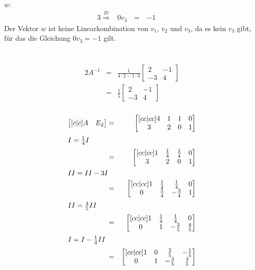 \documentclass[10pt,a4paper,oneside,ngerman,numbers=noenddot]{scrartcl}
\begin{document}
$w$:\\
\begin{alignat*}{3}
\overset{IV}{\Rightarrow} & 0v_{3} &\,=\,& -1 &&
\end{alignat*}
Der Vektor $w$ ist keine Linearkombination von $v_{1}$, $v_{2}$ und $v_{3}$, da es kein $v_{3}$ gibt, für das die Gleichung $0v_{3} = -1$ gilt.

\section{} %
\subsection{} %
\subsubsection{} %
\begin{alignat*}{2}
A^{-1} &=& \frac{1}{4 \cdot 2 - 1 \cdot 3} \begin{bmatrix} 2 & -1 \\ -3 & 4 \end{bmatrix} \\
&=& \frac{1}{5} \begin{bmatrix} 2 & -1 \\ -3 & 4 \end{bmatrix}
\end{alignat*}
\subsubsection{} %
\begin{alignat*}{2}
\begin{bmatrix}[c|c]
A & E_{2}
\end{bmatrix} &=& 
\begin{bmatrix}[cc|cc]
4 & 1 & 1 & 0 \\
3 & 2 & 0 & 1
\end{bmatrix} \\
\intertext{$I = \frac{1}{4}I$}
&=&
\begin{bmatrix}[cc|cc]
1 & \frac{1}{4} & \frac{1}{4} & 0 \\
3 & 2 & 0 & 1
\end{bmatrix} \\
\intertext{$II = II - 3I$}
&=&
\begin{bmatrix}[cc|cc]
1 & \frac{1}{4} & \frac{1}{4} & 0 \\
0 & \frac{5}{4} & -\frac{3}{4} & 1
\end{bmatrix} \\
\intertext{$II = \frac{4}{5}II$}
&=&
\begin{bmatrix}[cc|cc]
1 & \frac{1}{4} & \frac{1}{4} & 0 \\
0 & 1 & -\frac{3}{5} & \frac{4}{5}
\end{bmatrix} \\
\intertext{$I = I - \frac{1}{4}II$}
&=&
\begin{bmatrix}[cc|cc]
1 & 0 & \frac{2}{5} & -\frac{1}{5} \\
0 & 1 & -\frac{3}{5} & \frac{4}{5}
\end{bmatrix} \\
\end{alignat*}
\end{document}
